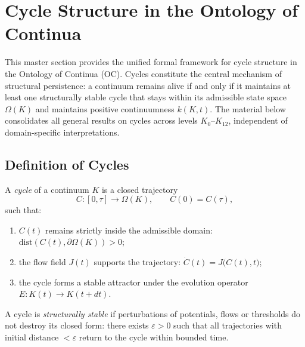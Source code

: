 
\section{Cycle Structure in the Ontology of Continua}
\label{sec:cycles-master}

This master section provides the unified formal framework for cycle
structure in the Ontology of Continua (OC).  
Cycles constitute the central mechanism of structural persistence:
a continuum remains alive if and only if it maintains at least one
structurally stable cycle that stays within its admissible state space
\(\Omega(K)\) and maintains positive continuumness \(k(K,t)\).
The material below consolidates all general results on cycles across
levels \(K_0\)–\(K_{12}\), independent of domain-specific interpretations.

\subsection{Definition of Cycles}

A \emph{cycle} of a continuum \(K\) is a closed trajectory
\[
  C : [0,\tau] \to \Omega(K),
  \qquad
  C(0)=C(\tau),
\]
such that:
\begin{enumerate}
  \item \(C(t)\) remains strictly inside the admissible domain:
        \(\mathrm{dist}(C(t),\partial\Omega(K)) > 0\);
  \item the flow field \(J(t)\) supports the trajectory:
        \(\dot{C}(t) = J\big(C(t),t\big)\);
  \item the cycle forms a stable attractor under the evolution operator
        \(E:K(t)\to K(t+dt)\).
\end{enumerate}

A cycle is \emph{structurally stable} if perturbations of potentials,
flows or thresholds do not destroy its closed form:
there exists \(\varepsilon > 0\) such that all trajectories with
initial distance \(<\varepsilon\) return to the cycle within bounded time.

